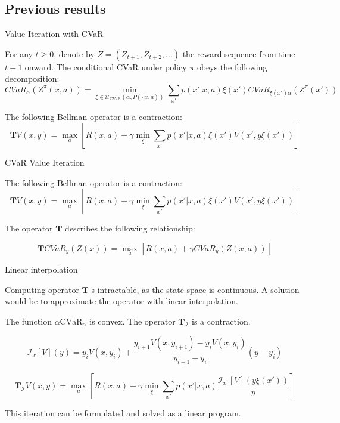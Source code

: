 \documentclass{beamer}
\newcommand{\cvar}{\text{CVaR}}
\newcommand{\envelope}{\mathcal{U}_{\cvar}(\alpha, P(\cdot | x, a))}
\newcommand{\bround}[1]{\left( {#1} \right)}
\newcommand{\bsquare}[1]{\left[ {#1} \right]}
\newcommand{\interpI}{\mathcal{I}}
\begin{document}
\subsection{Previous results}

\begin{frame}{Value Iteration with CVaR}

\begin{theorem}
For any $t\geq 0$, denote by $Z  = (Z_{t+1},Z_{t+2},\dots)$ the reward sequence from time $t+1$ onward. The conditional CVaR under policy $\pi$ obeys the following decomposition:
$$CVaR_\alpha\bround{Z^\pi(x, a)} = \min_{\xi \in \envelope} \sum_{x'} p(x'| x, a)\xi(x') CVaR_{\xi(x')\alpha}\bround{Z^\pi(x')}$$
\end{theorem}

\begin{theorem}
The following Bellman operator is a contraction:
$$\mathbf{T}V(x, y) = \max_a \bsquare{ R(x, a) + \gamma \min_{\xi} \sum_{x'} p(x'| x, a)\xi(x') V\bround{x', y\xi(x')}}$$
\end{theorem}

\end{frame}

\begin{frame}{CVaR Value Iteration}

\begin{theorem}
The following Bellman operator is a contraction:
$$\mathbf{T}V(x, y) = \max_a \bsquare{ R(x, a) + \gamma \min_{\xi} \sum_{x'} p(x'| x, a)\xi(x') V\bround{x', y\xi(x')}}$$
\end{theorem}

\vspace{1cm}

The operator $\mathbf{T}$ describes the following relationship:

$$\mathbf{T} CVaR_y(Z(x))=\max_a \bsquare{R(x, a) + \gamma CVaR_{y}(Z(x, a))}$$

\end{frame}


\begin{frame}{Linear interpolation}

Computing operator $\mathbf{T}$ s intractable, as the state-space is continuous. A solution would be to approximate the operator with linear interpolation.

\begin{theorem}
The function $\alpha\cvar_\alpha$ is convex. The operator $\mathbf{T}_\interpI$ is a contraction.

$$\interpI_{x}[V](y)=y_iV(x,y_{i})+\frac{y_{i+1}V(x,y_{i+1})-y_iV(x,y_{i})}{y_{i+1}-y_i}(y-y_i)$$

$$\mathbf{T}_\interpI V(x, y) = \max_a \bsquare{ R(x, a) + \gamma \min_{\xi} \sum_{x'} p(x'| x, a)\dfrac{\interpI_{x'} [V](y\xi(x'))}{y}}$$

\end{theorem}

This iteration can be formulated and solved as a linear program.

\end{frame}
\end{document}
